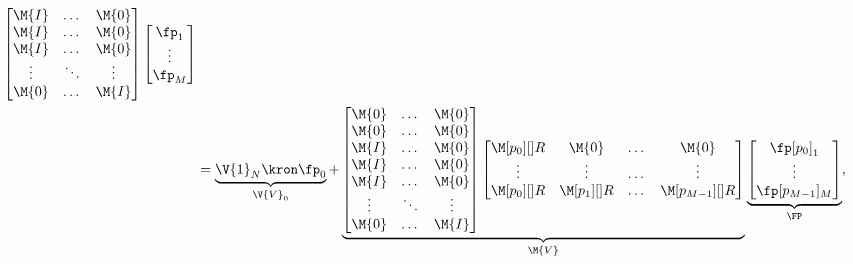 \begin{equation}
\begin{split}
\begin{bmatrix}
        \M{I}   &   \dots   &   \M{0} \\
        \M{I}   &   \dots   &   \M{0} \\
        \M{I}   &   \dots   &   \M{0} \\
        \vdots  &   \ddots  &   \vdots \\
        \M{0}   &   \dots   &   \M{I} \\
    \end{bmatrix}
    \begin{bmatrix}
        \fp_1 \\
        \vdots\\
        \fp_M\\
    \end{bmatrix}\\
    & =
    \underbrace{
        \V{1}_N
        \kron
        \fp_0
    }_{\V{V}_0}
    +
    \underbrace{
    \begin{bmatrix}
        \M{0}   &   \dots   &   \M{0} \\
        \M{0}   &   \dots   &   \M{0} \\
        \M{I}   &   \dots   &   \M{0} \\
        \M{I}   &   \dots   &   \M{0} \\
        \M{I}   &   \dots   &   \M{0} \\
        \vdots  &   \ddots  &   \vdots \\
        \M{0}   &   \dots   &   \M{I} \\
    \end{bmatrix}
    \begin{bmatrix}
        \M[p_{0}][]{R}  & \M{0}             & \dots & \M{0}             \\
        \vdots          & \vdots            & \dots & \vdots            \\
        \M[p_{0}][]{R}  & \M[p_{1}][]{R}    & \dots & \M[p_{M-1}][]{R}  \\
    \end{bmatrix}
    }_{\M{V}}
    \underbrace{
    \begin{bmatrix}
        \fp[p_0]_1\\
        \vdots\\
        \fp[p_{M-1}]_M\\
    \end{bmatrix}
    }_{\FP},
\end{split}
\end{equation}

